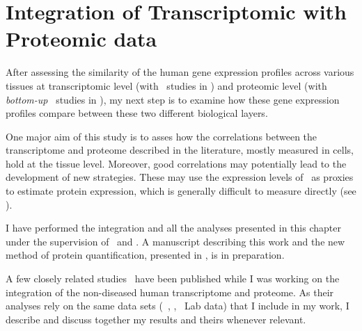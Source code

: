 \chapter{Integration of Transcriptomic with Proteomic data}\label{ch:Integration}
\setlength{\epigraphwidth}{0.8\textwidth}
\setlength{\epigraphrule}{0pt}


After assessing the similarity of the human gene expression profiles
across various tissues
at transcriptomic level (with \Rnaseq\ studies in )
and proteomic level (with \emph{bottom-up} \ms\ studies in ),
my next step is to examine how these gene expression profiles
compare between these two different biological layers.

One major aim of this study is to asses
how the correlations between the transcriptome and proteome
described in the literature, mostly measured in cells,
hold at the tissue level.
Moreover, good correlations may potentially lead to
the development of new strategies.
These may use the expression levels of \mRNA\ as proxies
to estimate protein expression,
which is generally difficult to measure directly (see ).

I have performed the integration and all the analyses presented in this chapter
under the supervision of \alvis\ and \jyoti.
A manuscript describing this work
and the new method of protein quantification, presented in ,
is in preparation.

A few closely related studies~ have
been published while I was working on
the integration of the non-diseased human transcriptome and proteome.
As their analyses rely on the same data sets (\ie\ \uhlen, \gtex, \pandey\ Lab data)
that I include in my work,
I describe and discuss together my results and theirs
whenever relevant.

